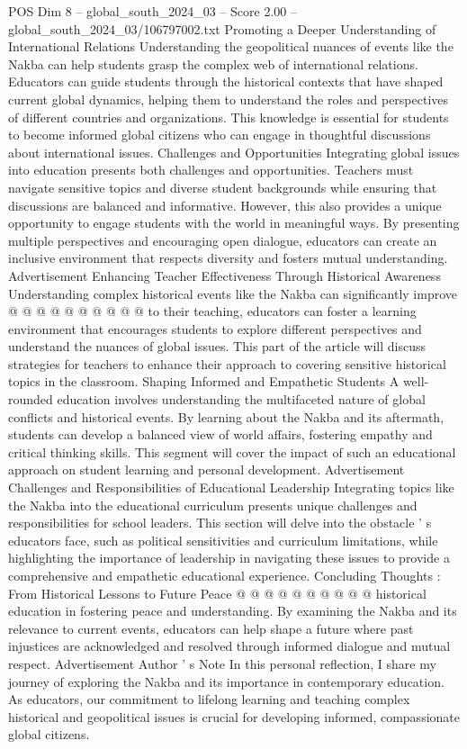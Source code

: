 \begin{textsample}{POS Dim 8 – global\_south\_2024\_03 – Score 2.00 – global\_south\_2024\_03/106797002.txt}
Promoting a Deeper Understanding of International Relations Understanding the geopolitical nuances of events like the Nakba can help students grasp the complex web of international relations.
Educators can guide students through the historical contexts that have shaped current global dynamics, helping them to understand the roles and perspectives of different countries and organizations.
This knowledge is essential for students to become informed global citizens who can engage in thoughtful discussions about international issues.
Challenges and Opportunities Integrating global issues into education presents both challenges and opportunities.
Teachers must navigate sensitive topics and diverse student backgrounds while ensuring that discussions are balanced and informative.
However, this also provides a unique opportunity to engage students with the world in meaningful ways.
By presenting multiple perspectives and encouraging open dialogue, educators can create an inclusive environment that respects diversity and fosters mutual understanding.
Advertisement Enhancing Teacher Effectiveness Through Historical Awareness Understanding complex historical events like the Nakba can significantly improve @ @ @ @ @ @ @ @ @ @ to their teaching, educators can foster a learning environment that encourages students to explore different perspectives and understand the nuances of global issues.
This part of the article will discuss strategies for teachers to enhance their approach to covering sensitive historical topics in the classroom.
Shaping Informed and Empathetic Students A well-rounded education involves understanding the multifaceted nature of global conflicts and historical events.
By learning about the Nakba and its aftermath, students can develop a balanced view of world affairs, fostering empathy and critical thinking skills.
This segment will cover the impact of such an educational approach on student learning and personal development.
Advertisement Challenges and Responsibilities of Educational Leadership Integrating topics like the Nakba into the educational curriculum presents unique challenges and responsibilities for school leaders.
This section will delve into the obstacle ' s educators face, such as political sensitivities and curriculum limitations, while highlighting the importance of leadership in navigating these issues to provide a comprehensive and empathetic educational experience.
Concluding Thoughts : From Historical Lessons to Future Peace @ @ @ @ @ @ @ @ @ @ historical education in fostering peace and understanding.
By examining the Nakba and its relevance to current events, educators can help shape a future where past injustices are acknowledged and resolved through informed dialogue and mutual respect.
Advertisement Author ' s Note In this personal reflection, I share my journey of exploring the Nakba and its importance in contemporary education.
As educators, our commitment to lifelong learning and teaching complex historical and geopolitical issues is crucial for developing informed, compassionate global citizens.

\end{textsample}
